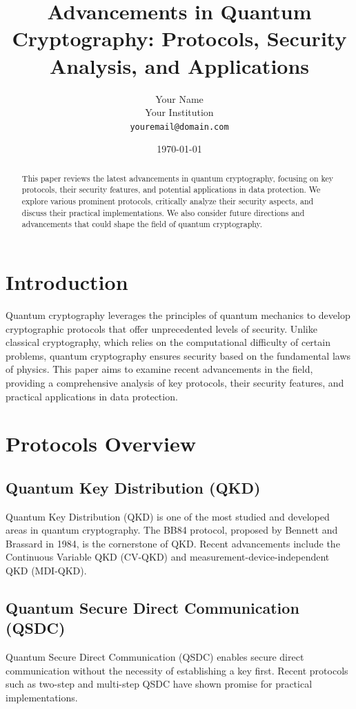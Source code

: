 \documentclass[12pt]{article}
\title{Advancements in Quantum Cryptography: Protocols, Security Analysis, and Applications}
\author{Your Name\\
\small{Your Institution}\\
\small{\texttt{youremail@domain.com}}}
\date{\today}
\begin{document}
\maketitle

\begin{abstract}
This paper reviews the latest advancements in quantum cryptography, focusing on key protocols, their security features, and potential applications in data protection. We explore various prominent protocols, critically analyze their security aspects, and discuss their practical implementations. We also consider future directions and advancements that could shape the field of quantum cryptography.
\end{abstract}

\section{Introduction}
Quantum cryptography leverages the principles of quantum mechanics to develop cryptographic protocols that offer unprecedented levels of security. Unlike classical cryptography, which relies on the computational difficulty of certain problems, quantum cryptography ensures security based on the fundamental laws of physics. This paper aims to examine recent advancements in the field, providing a comprehensive analysis of key protocols, their security features, and practical applications in data protection.

\section{Protocols Overview}
\subsection{Quantum Key Distribution (QKD)}
Quantum Key Distribution (QKD) is one of the most studied and developed areas in quantum cryptography. The BB84 protocol, proposed by Bennett and Brassard in 1984, is the cornerstone of QKD. Recent advancements include the Continuous Variable QKD (CV-QKD) and measurement-device-independent QKD (MDI-QKD).

\subsection{Quantum Secure Direct Communication (QSDC)}
Quantum Secure Direct Communication (QSDC) enables secure direct communication without the necessity of establishing a key first. Recent protocols such as two-step and multi-step QSDC have shown promise for practical implementations.
\end{document}
